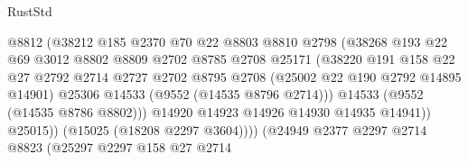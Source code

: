 \begin{lexlean}{RustStd}
\begin{coremodule}
                                      @8812
                                      (@38212
                                        @185
                                        @2370
                                        @70
                                        @22
                                        @8803
                                        @8810
                                        @2798
                                        (@38268
                                          @193
                                          @22
                                          @69
                                          @3012
                                          @8802
                                          @8809
                                          @2702
                                          @8785
                                          @2708
                                          @25171
                                          (@38220
                                            @191
                                            @158
                                            @22
                                            @27
                                            @2792
                                            @2714
                                            @2727
                                            @2702
                                            @8795
                                            @2708
                                            (@25002 @22 @190 @2792 @14895 @14901)
                                            @25306
                                            @14533
                                            (@9552 (@14535 @8796 @2714)))
                                          @14533
                                          (@9552 (@14535 @8786 @8802)))
                                        @14920
                                        @14923
                                        @14926
                                        @14930
                                        @14935
                                        @14941))
                                    @25015))
                                (@15025 (@18208 @2297 @3604))))
                            (@24949
                              @2377
                              @2297
                              @2714
                              @8823
                              (@25297
                                @2297
                                @158
                                @27
                                @2714

\end{coremodule}
\end{lexlean}
